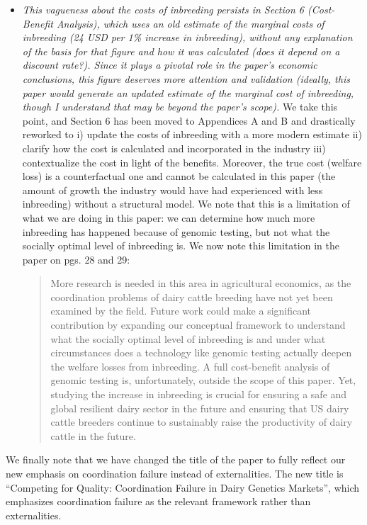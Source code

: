 \documentclass[12pt,letterpaper]{article}
\begin{document}
\begin{itemize}
\item \textit{This vagueness about the costs of inbreeding persists in Section 6 (Cost-Benefit Analysis), which uses an old estimate of the marginal costs of inbreeding (24 USD per 1\% increase in inbreeding), without any explanation of the basis for that figure and how it was calculated (does it depend on a discount rate?). Since it plays a pivotal role in the paper’s economic conclusions, this figure deserves more attention and validation (ideally, this paper would generate an updated estimate of the marginal cost of inbreeding, though I understand that may be beyond the paper’s scope).} We take this point, and Section 6 has been moved to Appendices A and B and drastically reworked to i) update the costs of inbreeding with a more modern estimate ii) clarify how the cost is calculated and incorporated in the industry iii) contextualize the cost in light of the benefits. Moreover, the true cost (welfare loss) is a counterfactual one and cannot be calculated in this paper (the amount of growth the industry would have had experienced with less inbreeding) without a structural model. We note that this is a limitation of what we are doing in this paper: we can determine how much more inbreeding has happened because of genomic testing, but not what the socially optimal level of inbreeding is. We now note this limitation in the paper on pgs. 28 and 29:
\begin{quote}
More research is needed in this area in agricultural economics, as the coordination problems of dairy cattle breeding have not yet been examined by the field.
Future work could make a significant contribution by expanding our conceptual framework to understand what the socially optimal level of inbreeding is and under what circumstances does a technology like genomic testing actually deepen the welfare losses from inbreeding.
A full cost-benefit analysis of genomic testing is, unfortunately, outside the scope of this paper.
Yet, studying the increase in inbreeding is crucial for ensuring a safe and global resilient dairy sector in the future and ensuring that US dairy cattle breeders continue to sustainably raise the productivity of dairy cattle in the future.

\end{quote}
\end{itemize}

We finally note that we have changed the title of the paper to fully reflect our new emphasis on coordination failure instead of externalities. The new title is ``Competing for Quality: Coordination Failure in Dairy Genetics Markets'', which emphasizes coordination failure as the relevant framework rather than externalities.
\end{document}
